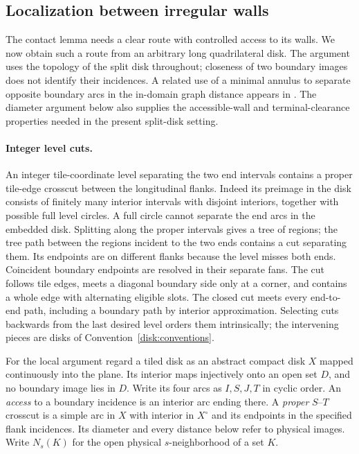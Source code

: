 \subsection{Localization between irregular walls}

The contact lemma needs a clear route with controlled access to its
walls.  We now obtain such a route from an arbitrary long quadrilateral
disk.  The argument uses the topology of the split disk throughout;
closeness of two boundary images does not identify their incidences.
A related use of a minimal annulus to separate opposite boundary arcs
in the in-domain graph distance appears in
\citet[Section~4, following Fact~4.1]{DuminilCopinManolescuTassion2021}.
The diameter argument below also supplies the accessible-wall and
terminal-clearance properties needed in the present split-disk setting.

\paragraph{Integer level cuts.}
An integer tile-coordinate level separating the two end intervals
contains a proper tile-edge crosscut between the longitudinal flanks.
Indeed its preimage in the disk consists of finitely many interior
intervals with disjoint interiors, together with possible full level
circles.  A full circle cannot separate the end arcs in the embedded
disk.  Splitting along the proper intervals gives a tree of regions;
the tree path between the regions incident to the two ends contains a
cut separating them.  Its endpoints are on different flanks because
the level misses both ends.  Coincident boundary endpoints are resolved
in their separate fans.  The cut follows tile edges, meets a diagonal
boundary side only at a corner, and contains a whole edge with
alternating eligible slots.  The closed cut meets every end-to-end
path, including a boundary path by interior approximation.  Selecting
cuts backwards from the last desired level orders them intrinsically;
the intervening pieces are disks of Convention~\ref{disk:conventions}.

For the local argument regard a tiled disk as an abstract compact disk
$X$ mapped continuously into the plane.  Its interior maps injectively
onto an open set $D$, and no boundary image lies in $D$.  Write its
four arcs as $I,S,J,T$ in cyclic order.  An \emph{access} to a boundary
incidence is an interior arc ending there.  A \emph{proper} $S$--$T$
crosscut is a simple arc in $X$ with interior in $X^\circ$ and its
endpoints in the specified flank incidences.  Its diameter and every
distance below refer to physical images.  Write $N_s(K)$ for the
open physical $s$-neighborhood of a set $K$.

